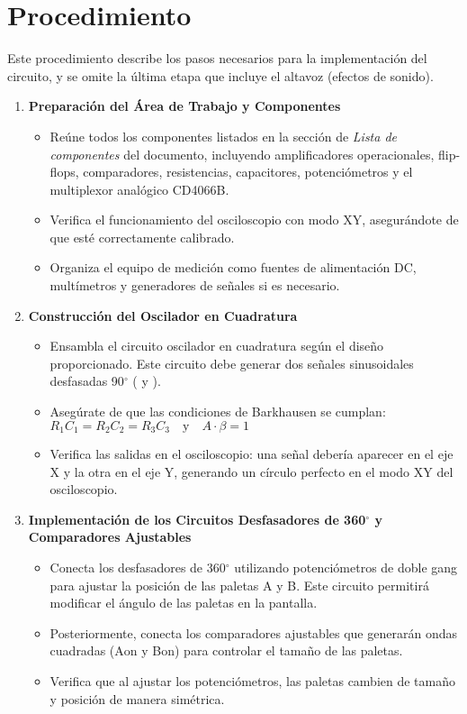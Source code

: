 \section*{Procedimiento}

Este procedimiento describe los pasos necesarios para la implementación del circuito, y se omite la última etapa que incluye el altavoz (efectos de sonido).

\begin{enumerate}
\item \textbf{Preparación del Área de Trabajo y Componentes}
\begin{itemize}
\item Reúne todos los componentes listados en la sección de \textit{Lista de componentes} del documento, incluyendo amplificadores operacionales, flip-flops, comparadores, resistencias, capacitores, potenciómetros y el multiplexor analógico CD4066B.
\item Verifica el funcionamiento del osciloscopio con modo XY, asegurándote de que esté correctamente calibrado.
\item Organiza el equipo de medición como fuentes de alimentación DC, multímetros y generadores de señales si es necesario.
\end{itemize}

\item \textbf{Construcción del Oscilador en Cuadratura}
\begin{itemize}
\item Ensambla el circuito oscilador en cuadratura según el diseño proporcionado. Este circuito debe generar dos señales sinusoidales desfasadas 90$^{\circ}$ ( y ).
\item Asegúrate de que las condiciones de Barkhausen se cumplan: \( R_1 C_1 = R_2 C_2 = R_3 C_3 \quad \text{y} \quad A \cdot \beta = 1 \)



\item Verifica las salidas en el osciloscopio: una señal debería aparecer en el eje X y la otra en el eje Y, generando un círculo perfecto en el modo XY del osciloscopio.
\end{itemize}

\item \textbf{Implementación de los Circuitos Desfasadores de 360$^{\circ}$ y Comparadores Ajustables}
\begin{itemize}
\item Conecta los desfasadores de 360$^{\circ}$ utilizando potenciómetros de doble gang para ajustar la posición de las paletas A y B. Este circuito permitirá modificar el ángulo de las paletas en la pantalla.
\item Posteriormente, conecta los comparadores ajustables que generarán ondas cuadradas (A${\mathrm{on}}$ y B${\mathrm{on}}$) para controlar el tamaño de las paletas.
\item Verifica que al ajustar los potenciómetros, las paletas cambien de tamaño y posición de manera simétrica.
\end{itemize}


\end{enumerate}
